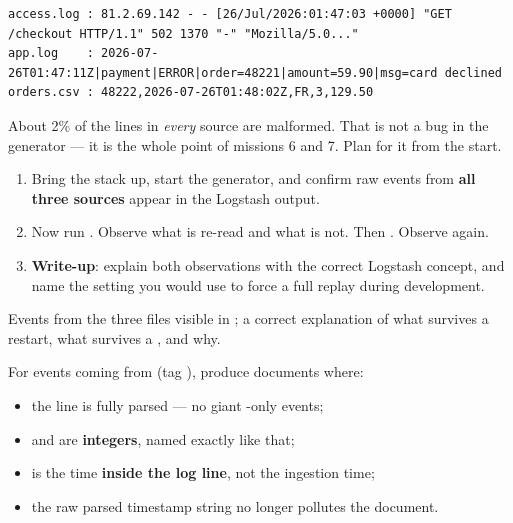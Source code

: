 \documentclass[11pt,a4paper]{article}
\begin{document}
\begin{lstlisting}
access.log : 81.2.69.142 - - [26/Jul/2026:01:47:03 +0000] "GET /checkout HTTP/1.1" 502 1370 "-" "Mozilla/5.0..."
app.log    : 2026-07-26T01:47:11Z|payment|ERROR|order=48221|amount=59.90|msg=card declined
orders.csv : 48222,2026-07-26T01:48:02Z,FR,3,129.50
\end{lstlisting}

\begin{trapbox}
About 2\% of the lines in \emph{every} source are malformed. That is not a bug
in the generator — it is the whole point of missions 6 and 7. Plan for it from
the start.
\end{trapbox}


\begin{enumerate}
  \item Bring the stack up, start the generator, and confirm raw events from
        \textbf{all three sources} appear in the Logstash output.
  \item Now run . Observe what is re-read
        and what is not. Then .
        Observe again.
  \item \textbf{Write-up}: explain both observations with the correct Logstash
        concept, and name the setting you would use to force a full replay
        during development.
\end{enumerate}

\begin{whybox}
Events from the three files visible in ;
a correct explanation of what survives a restart, what survives a
, and why.
\end{whybox}


For events coming from  (tag ), produce documents
where:
\begin{itemize}
  \item the line is fully parsed — no giant -only events;
  \item {} and  are \textbf{integers}, named exactly like that;
  \item {} is the time \textbf{inside the log line}, not the ingestion time;
  \item the raw parsed timestamp string no longer pollutes the document.
\end{itemize}
\end{document}
